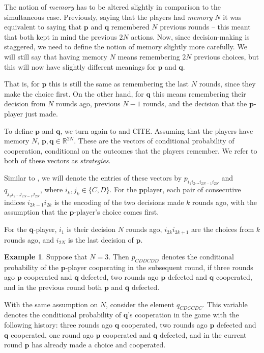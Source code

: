 \documentclass{article}
\def\p{\mathbf{p}}
\def\q{\mathbf{q}}
\theoremstyle{definition}
\newtheorem{example}[theorem]{Example}
\numberwithin{equation}{section}
\begin{document}
The notion of \textit{memory} has to be altered slightly in comparison to the simultaneous case. Previously, saying that the players had \textit{memory} $N$ it was equivalent  to saying that  $\p$ and $\q$ remembered $N$ previous rounds -- this meant that both kept in mind the previous $2N$ actions. Now, since decision-making is staggered, we need to define the notion of memory slightly more carefully. We will still say that having memory $N$ means remembering $2N$ previous choices, but this will now have slightly different meanings for $\p$ and $\q$. 

That is, for $\p$ this is still the same as remembering the last $N$ rounds, since they make the choice first. On the other hand, for $\q$ this means remembering their decision from $N$ rounds ago, previous $N-1$ rounds, and the decision that the $\p$-player just made. 

 

To define $\p$ and $\q$, we turn again  to \cite{balabanova2024adaptive} and CITE. Assuming that the players have memory $N$,  $\p,\q\in\mathbb{R}^{2N}$. These are the vectors of conditional probability of cooperation, conditional on the outcomes that the players remember. We refer to both of these vectors as \textit{strategies}.

Similar to \cite{balabanova2024adaptive}, we will denote the entries of these vectors  by $p_{i_1 i_2\ldots i_{2N-1}i_{2N}}$ and $q_{j_1 j_2\ldots j_{2N-1}j_{2N}}$, where $i_k, j_k\in\{C,D\}$. For the $\p$player, each pair of consecutive indices $i_{2k-1}i_{2k}$ is the encoding of the two decisions made  $k$ rounds ago, with the assumption that the $\p$-player's choice comes first.

For the $\q$-player, $i_1$ is their decision $N$ rounds ago, $i_{2k} i_{2k+1}$ are the choices from $k$ rounds ago, and $i_{2N}$ is the last decision of $\p$. 

\begin{example}
    Suppose that $N=3$. Then $p_{CDDCDD}$ denotes the conditional probability of the $\p$-player cooperating in the subsequent round, if three rounds ago $\p$ cooperated and $\q$ defected, two rounds ago $\p$ defected and $\q$ cooperated, and in the previous round both $\p$ and $\q$ defected. 

    With the same assumption on $N$, consider the element $q_{CDCCDC}$. This variable denotes the conditional probability of $\q$'s cooperation in the game with the following history: three rounds ago $\q$ cooperated, two rounds ago $\p$ defected and $\q$ cooperated, one round ago $\p$ cooperated and $\q$ defected, and in the current round $\p$ has already made a choice and cooperated. 
\end{example}
\end{document}
